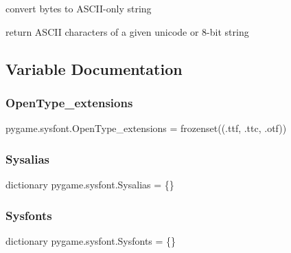 \begin{DoxyVerb}convert bytes to ASCII-only string\end{DoxyVerb}


\begin{DoxyVerb}return ASCII characters of a given unicode or 8-bit string\end{DoxyVerb}
 

\subsection{Variable Documentation}
\mbox{\label{namespacepygame_1_1sysfont_aaa890b33881f8a07980f1d06b8a257aa}} 
\subsubsection{\texorpdfstring{Open\+Type\+\_\+extensions}{OpenType\_extensions}}
{\footnotesize\ttfamily pygame.\+sysfont.\+Open\+Type\+\_\+extensions = frozenset((\textquotesingle{}.ttf\textquotesingle{}, \textquotesingle{}.ttc\textquotesingle{}, \textquotesingle{}.otf\textquotesingle{}))}

\mbox{\label{namespacepygame_1_1sysfont_afa74eda06733ccb879a491504a973a78}} 
\subsubsection{\texorpdfstring{Sysalias}{Sysalias}}
{\footnotesize\ttfamily dictionary pygame.\+sysfont.\+Sysalias = \{\}}

\mbox{\label{namespacepygame_1_1sysfont_a80767b051c6fdf72ba3bcaeb9150ca79}} 
\subsubsection{\texorpdfstring{Sysfonts}{Sysfonts}}
{\footnotesize\ttfamily dictionary pygame.\+sysfont.\+Sysfonts = \{\}}

